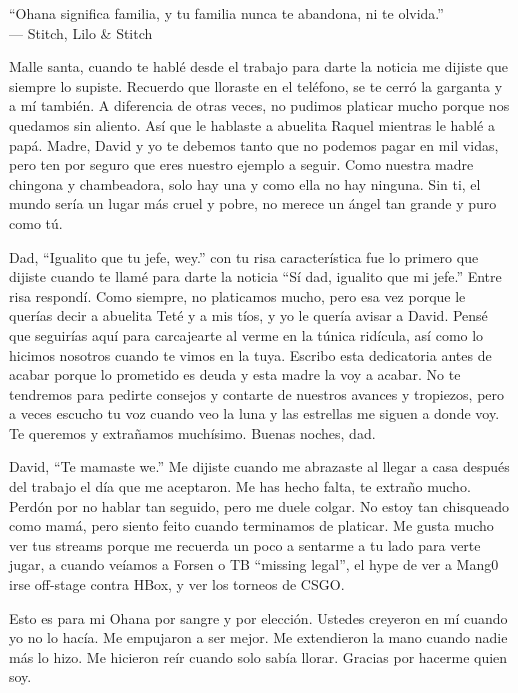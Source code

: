 \begin{frontmatter}[Dedication]
    \centering
    ``Ohana significa familia, y tu familia nunca te abandona, ni te olvida.''\\
    --- Stitch, Lilo \& Stitch

    \justify
    Malle santa, cuando te hablé desde el trabajo para darte la noticia me dijiste que siempre lo supiste. Recuerdo que lloraste en el teléfono, se te cerró la garganta y a mí también. A diferencia de otras veces, no pudimos platicar mucho porque nos quedamos sin aliento. Así que le hablaste a abuelita Raquel mientras le hablé a papá. Madre, David y yo te debemos tanto que no podemos pagar en mil vidas, pero ten por seguro que eres nuestro ejemplo a seguir. Como nuestra madre chingona y chambeadora, solo hay una y como ella no hay ninguna. Sin ti, el mundo sería un lugar más cruel y pobre, no merece un ángel tan grande y puro como tú.

    Dad, ``Igualito que tu jefe, wey.'' con tu risa característica fue lo primero que dijiste cuando te llamé para darte la noticia ``Sí dad, igualito que mi jefe.'' Entre risa respondí. Como siempre, no platicamos mucho, pero esa vez porque le querías decir a abuelita Teté y a mis tíos, y yo le quería avisar a David. Pensé que seguirías aquí para carcajearte al verme en la túnica ridícula, así como lo hicimos nosotros cuando te vimos en la tuya. Escribo esta dedicatoria antes de acabar porque lo prometido es deuda y esta madre la voy a acabar. No te tendremos para pedirte consejos y contarte de nuestros avances y tropiezos, pero a veces escucho tu voz cuando veo la luna y las estrellas me siguen a donde voy. Te queremos y extrañamos muchísimo. Buenas noches, dad.

    David, ``Te mamaste we.'' Me dijiste cuando me abrazaste al llegar a casa después del trabajo el día que me aceptaron. Me has hecho falta, te extraño mucho. Perdón por no hablar tan seguido, pero me duele colgar. No estoy tan chisqueado como mamá, pero siento feito cuando terminamos de platicar. Me gusta mucho ver tus streams porque me recuerda un poco a sentarme a tu lado para verte jugar, a cuando veíamos a Forsen o TB ``missing legal'', el hype de ver a Mang0 irse off-stage contra HBox, y ver los torneos de CSGO.

    Esto es para mi Ohana por sangre y por elección. Ustedes creyeron en mí cuando yo no lo hacía. Me empujaron a ser mejor. Me extendieron la mano cuando nadie más lo hizo. Me hicieron reír cuando solo sabía llorar. Gracias por hacerme quien soy.
\end{frontmatter}

